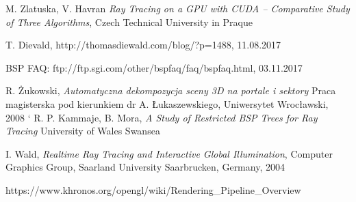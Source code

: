 \documentclass[eng,pl,printmode,openany]{mgr}
\begin{document}
\begin{thebibliography}{9}
	
	M. Zlatuska, V. Havran
	\emph{Ray Tracing on a GPU with CUDA –
Comparative Study of Three Algorithms},
	Czech Technical University in Praque
	
	T. Dievald, http://thomasdiewald.com/blog/?p=1488, 11.08.2017
	
	BSP FAQ: ftp://ftp.sgi.com/other/bspfaq/faq/bspfaq.html, 03.11.2017
	
	R. Żukowski,
	\emph{Automatyczna dekompozycja sceny 3D na portale i sektory}
	Praca magisterska pod kierunkiem dr A. Łukaszewskiego,
	Uniwersytet Wrocławski,
	2008
`	
	R. P. Kammaje, B. Mora,
	\emph{A Study of Restricted BSP Trees for Ray Tracing}
	University of Wales Swansea
	
	I. Wald,
	\emph{Realtime Ray Tracing and Interactive Global Illumination},
	Computer Graphics Group, Saarland University Saarbrucken, Germany,
	2004
	
	https://www.khronos.org/opengl/wiki/Rendering\_Pipeline\_Overview
	
\end{thebibliography}
\end{document}
